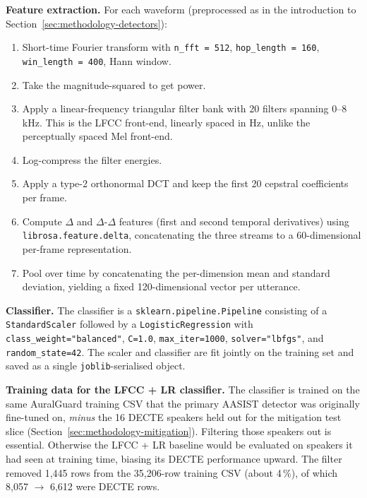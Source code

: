 \textbf{Feature extraction.} For each waveform (preprocessed as in the
introduction to Section~\ref{sec:methodology-detectors}):

\begin{enumerate}
    \item Short-time Fourier transform with \texttt{n\_fft = 512}, \texttt{hop\_length = 160},
        \texttt{win\_length = 400}, Hann window.
    \item Take the magnitude-squared to get power.
    \item Apply a linear-frequency triangular filter bank with 20 filters
        spanning 0--8\,kHz. This is the LFCC front-end, linearly spaced
        in Hz, unlike the perceptually spaced Mel front-end.
    \item Log-compress the filter energies.
    \item Apply a type-2 orthonormal DCT and keep the first 20 cepstral
        coefficients per frame.
    \item Compute $\Delta$ and $\Delta$-$\Delta$ features (first and second temporal derivatives)
        using \texttt{librosa.feature.delta}, concatenating the three streams to
        a 60-dimensional per-frame representation.
    \item Pool over time by concatenating the per-dimension mean and
        standard deviation, yielding a fixed 120-dimensional vector per
        utterance.
\end{enumerate}

\textbf{Classifier.} The classifier is a
\texttt{sklearn.pipeline.Pipeline} consisting of a
\texttt{StandardScaler} followed by a \texttt{LogisticRegression}
with \texttt{class\_weight="balanced"}, \texttt{C=1.0},
\texttt{max\_iter=1000}, \texttt{solver="lbfgs"}, and
\texttt{random\_state=42}. The scaler and classifier are fit jointly
on the training set and saved as a single \texttt{joblib}-serialised
object.

\textbf{Training data for the LFCC + LR classifier.} The classifier
is trained on the same AuralGuard training CSV that the primary
AASIST detector was originally fine-tuned on, \emph{minus} the 16
DECTE speakers held out for the mitigation test slice
(Section~\ref{sec:methodology-mitigation}). Filtering those speakers
out is essential. Otherwise the LFCC + LR baseline would be
evaluated on speakers it had seen at training time, biasing its
DECTE performance upward. The filter removed 1,445 rows from the
35,206-row training CSV (about 4\,\%), of which 8,057 $\rightarrow$
6,612 were DECTE rows.

